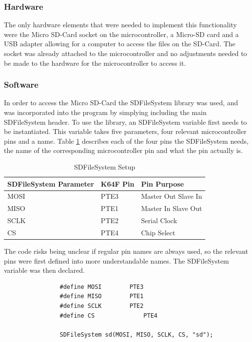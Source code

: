 				\subsubsection{Hardware}
				The only hardware elements that were needed to implement this functionality were the Micro SD-Card socket on the microcontroller, a Micro-SD card and a USB adapter allowing for a computer to access the files on the SD-Card. The socket was already attached to the microcontroller and no adjustments needed to be made to the hardware for the microcontroller to access it.
				
				\subsubsection{Software}
				In order to access the Micro SD-Card the SDFileSystem library was used, and was incorporated into the program by simplying including the main SDFileSystem header. To use the library, an SDFileSystem variable first needs to be instantiated. This variable takes five parameters, four relevant microcontroller pins and a name. Table \ref{table:sdfilesystempins} describes each of the four pins the SDFileSystem needs, the name of the corresponding microcontroller pin and what the pin actually is.
	
				\begin{table}[h!]
					\centering
					\begin{tabular}{|| l | l | l ||} 
						\hline
						SDFileSystem Parameter & K64F Pin & Pin Purpose \\ [0.5ex] 
						\hline
						MOSI  & PTE3 & Master Out Slave In \\ 
						MISO  & PTE1  & Master In Slave Out \\
						SCLK  & PTE2 & Serial Clock \\
						CS & PTE4 & Chip Select \\ [1ex] 
						\hline
					\end{tabular}
					\caption{SDFileSystem Setup}
					\label{table:sdfilesystempins}
				\end{table}
			
				The code risks being unclear if regular pin names are always used, so the relevant pins were first defined into more understandable names. The SDFileSystem variable was then declared.
				
				\begin{lstlisting}
				#define MOSI		PTE3
				#define MISO		PTE1
				#define	SCLK		PTE2
				#define	CS				PTE4
				
				SDFileSystem sd(MOSI, MISO, SCLK, CS, "sd");
				\end{lstlisting}
				
